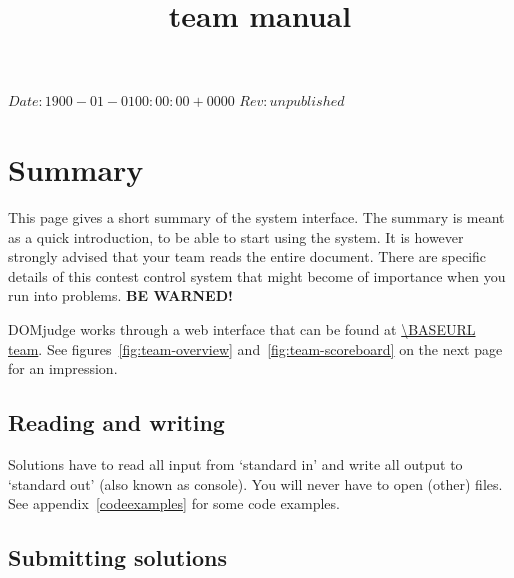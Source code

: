 

\usepackage[english]{babel}

\SVN $Date: 1900-01-01 00:00:00 +0000 $
\SVN $Rev: unpublished $

\title{\DOMjudge team manual}




\titlestuff{\DOMJUDGEVERSION}{\SVNRev}{\SVNDate}{\today}

\section*{Summary}

This page gives a short summary of the system interface. The summary
is meant as a quick introduction, to be able to start using the system.
It is however strongly advised that your team reads the entire document.
There are specific details of this contest control system that might become of
importance when you run into problems. \textbf{BE WARNED!}

DOMjudge works through a web interface that can be found at
\url{\BASEURL team}. See figures~\ref{fig:team-overview}
and~\ref{fig:team-scoreboard} on the next page for an impression.

\subsection*{Reading and writing}

Solutions have to read all input from `standard in' and write all
output to `standard out' (also known as console). You will never have
to open (other) files. See appendix~\ref{codeexamples} for some code
examples.

\subsection*{Submitting solutions}

